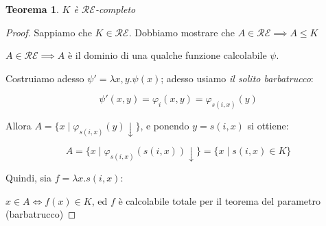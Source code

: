\documentclass[a4paper,10pt,oneside]{article}
\theoremstyle{break}
\newtheorem{teo}{Teorema}[subsection]
\newcommand{\RE}{\mathcal {RE}}
\begin{document}
\begin{mdframed}
 \begin{teo}
  $K$ è $\mathcal{RE}$-completo
 \end{teo}
 \begin{proof}
  Sappiamo che $K \in \RE$. Dobbiamo mostrare che $A \in \RE \implies A \leq K$\smallskip
  
  $A \in \RE \implies A$ è il dominio di una qualche funzione calcolabile $\psi$. \smallskip
  
  
  Costruiamo adesso $\psi' = \lambda x, y . \psi(x)$; adesso usiamo \emph{il solito barbatrucco}:
  
  \[ \psi'(x, y) = \varphi_i(x, y) = \varphi_{s(i, x)}(y) \]
  
  Allora $A = \{ x \mid \varphi_{s(i, x)}(y) \downarrow \}$, e ponendo $y = s(i, x)$ si ottiene:
  
  \[A = \{ x \mid \varphi_{s(i, x)}(s(i, x)) \downarrow \} = \{x \mid s(i, x) \in K\}\]
  
 Quindi, sia $f = \lambda x.s(i, x)$:\smallskip
 
 
 $x \in A \iff f(x) \in K$, ed $f$ è calcolabile totale per il teorema del parametro (barbatrucco)
 \end{proof}

\end{mdframed}
\newpage
\end{document}
